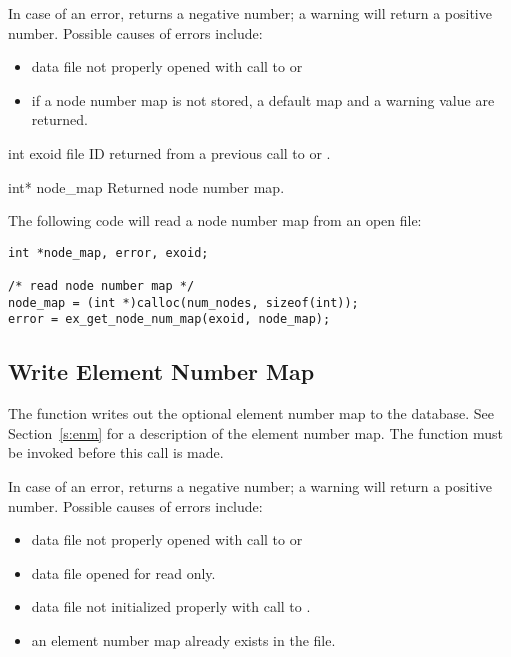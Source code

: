 In case of an error,  returns a
negative number; a warning will return a positive number. Possible
causes of errors include:

\begin{itemize}
 \item data file not properly opened with call to 
 or 

 \item if a node number map is not stored, a default map 
and a warning value are returned.
\end{itemize}



\begin{parameters}
\item[{int exoid \R{}}]
\exo{} file ID returned from a previous call to  or
.

\item[{int* node_map \W{}}]
Returned node number map.
\end{parameters}

The following code will read a node number map from an open 
\exo{} file:

\begin{lstlisting}
int *node_map, error, exoid;

/* read node number map */
node_map = (int *)calloc(num_nodes, sizeof(int));
error = ex_get_node_num_map(exoid, node_map);
\end{lstlisting}

\subsection{Write Element Number Map}

The function  writes out the optional
element number map to the database. See Section~\ref{s:enm} for a
description of the element number map. The function
 must be invoked before this call is made.

In case of an error,  returns a
negative number; a warning will return a positive number. Possible
causes of errors include:

\begin{itemize}

 \item data file not properly opened with call to 
 or 

 \item data file opened for read only.

 \item data file not initialized properly with call to
 .

 \item an element number map already exists in the file.
\end{itemize}



